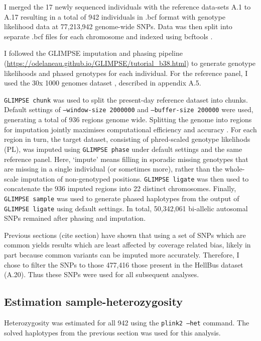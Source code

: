 I merged the 17 newly sequenced individuals with the reference data-sets A.1 to A.17 resulting in a total of 942 individuals in .bcf format with genotype likelihood data at 77,213,942 genome-wide SNPs. Data was then split into separate .bcf files for each chromosome and indexed using bcftools \cite{li2009sequence}.

I followed the GLIMPSE \cite{rubinacci2021efficient} imputation and phasing pipeline (\url{https://odelaneau.github.io/GLIMPSE/tutorial_b38.html}) to generate genotype likelihoods and phased genotypes for each individual. For the reference panel, I used the 30x 1000 genomes dataset \cite{byrska2021high}, described in appendix A.5.  

\texttt{GLIMPSE chunk} was used to split the present-day reference dataset into chunks. Default settings of \texttt{--window-size 2000000} and \texttt{--buffer-size 200000} were used, generating a total of 936 regions genome wide. Splitting the genome into regions for imputation jointly maximises computational efficiency and accuracy \cite{rubinacci2021efficient}. For each region in turn, the target dataset, consisting of phred-scaled genotype likelihods (PL), was imputed using \texttt{GLIMPSE phase} under default settings and the same reference panel. Here, `impute' means filling in sporadic missing genotypes that are missing in a single individual (or sometimes more), rather than the whole-scale imputation of non-genotyped positions. \texttt{GLIMPSE ligate} was then used to concatenate the 936 imputed regions into 22 distinct chromosomes. Finally, \texttt{GLIMPSE sample} was used to generate phased haplotypes from the output of \texttt{GLIMPSE ligate} using default settings. In total, 50,342,061 bi-allelic autosomal SNPs remained after phasing and imputation. 

Previous sections (cite section) have shown that using a set of SNPs which are common yields results which are least affected by coverage related bias, likely in part because common variants can be imputed more accurately. Therefore, I chose to filter the SNPs to those 477,416 those present in the HellBus dataset (A.20). Thus these SNPs were used for all subsequent analyses. 

\subsection{Estimation sample-heterozygosity}

Heterozygosity was estimated for all 942 using the \texttt{plink2 --het} command. The solved haplotypes from the previous section was used for this analysis. 

